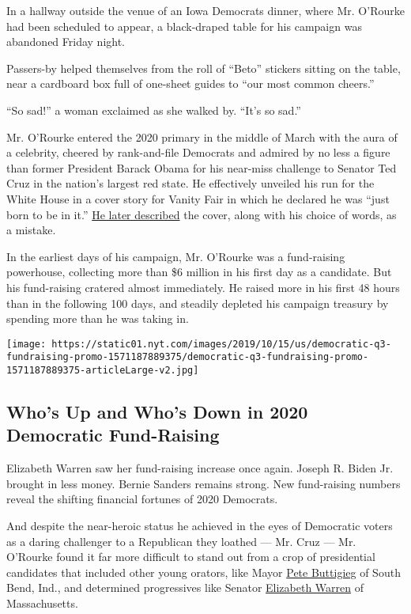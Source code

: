 In a hallway outside the venue of an Iowa Democrats dinner, where Mr.
O'Rourke had been scheduled to appear, a black-draped table for his
campaign was abandoned Friday night.

Passers-by helped themselves from the roll of ``Beto'' stickers sitting
on the table, near a cardboard box full of one-sheet guides to ``our
most common cheers.''

``So sad!'' a woman exclaimed as she walked by. ``It's so sad.''

Mr. O'Rourke entered the 2020 primary in the middle of March with the
aura of a celebrity, cheered by rank-and-file Democrats and admired by
no less a figure than former President Barack Obama for his near-miss
challenge to Senator Ted Cruz in the nation's largest red state. He
effectively unveiled his run for the White House in a cover story for
Vanity Fair in which he declared he was ``just born to be in it.''
\href{https://www.nytimes.com/2019/05/14/us/politics/beto-privilege.html}{He
later described} the cover, along with his choice of words, as a
mistake.

In the earliest days of his campaign, Mr. O'Rourke was a fund-raising
powerhouse, collecting more than \$6 million in his first day as a
candidate. But his fund-raising cratered almost immediately. He raised
more in his first 48 hours than in the following 100 days, and steadily
depleted his campaign treasury by spending more than he was taking in.

\href{https://www.nytimes.com/interactive/2019/10/16/us/elections/democratic-q3-fundraising.html}{}

\texttt{[image: https://static01.nyt.com/images/2019/10/15/us/democratic-q3-fundraising-promo-1571187889375/democratic-q3-fundraising-promo-1571187889375-articleLarge-v2.jpg]}

\hypertarget{whos-up-and-whos-down-in-2020-democratic-fund-raising}{%
\subsection{Who's Up and Who's Down in 2020 Democratic
Fund-Raising}\label{whos-up-and-whos-down-in-2020-democratic-fund-raising}}

Elizabeth Warren saw her fund-raising increase once again. Joseph R.
Biden Jr. brought in less money. Bernie Sanders remains strong. New
fund-raising numbers reveal the shifting financial fortunes of 2020
Democrats.

And despite the near-heroic status he achieved in the eyes of Democratic
voters as a daring challenger to a Republican they loathed --- Mr. Cruz
--- Mr. O'Rourke found it far more difficult to stand out from a crop of
presidential candidates that included other young orators, like Mayor
\href{https://www.nytimes.com/interactive/2020/us/elections/pete-buttigieg.html}{Pete
Buttigieg} of South Bend, Ind., and determined progressives like Senator
\href{https://www.nytimes.com/interactive/2020/us/elections/elizabeth-warren.html}{Elizabeth
Warren} of Massachusetts.

